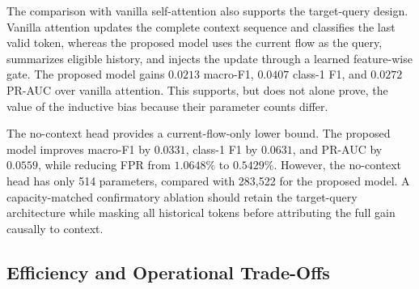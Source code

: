 \documentclass[11pt,fleqn]{report}
\begin{document}
The comparison with vanilla self-attention also supports the target-query
design. Vanilla attention updates the complete context sequence and classifies
the last valid token, whereas the proposed model uses the current flow as the
query, summarizes eligible history, and injects the update through a learned
feature-wise gate. The proposed model gains $0.0213$ macro-F1, $0.0407$
class-1 F1, and $0.0272$ PR-AUC over vanilla attention. This supports, but does
not alone prove, the value of the inductive bias because their parameter counts
differ.

The no-context head provides a current-flow-only lower bound. The proposed
model improves macro-F1 by $0.0331$, class-1 F1 by $0.0631$, and PR-AUC by
$0.0559$, while reducing FPR from $1.0648\%$ to $0.5429\%$. 
However, the
no-context head has only 514 parameters, compared with 283,522 for the proposed
model. A capacity-matched confirmatory ablation should retain the target-query
architecture while masking all historical tokens before attributing the full
gain causally to context.



\subsection{Efficiency and Operational Trade-Offs}
\label{subsec:results_statistical_efficiency}
\end{document}

